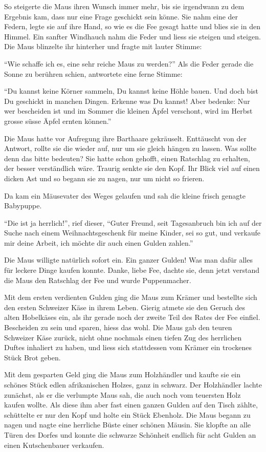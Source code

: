 So steigerte die Maus ihren Wunsch immer mehr, bis sie irgendwann zu dem Ergebnis kam, dass nur eine Frage geschickt sein könne. Sie nahm eine der Federn, legte sie auf ihre Hand, so wie es die Fee gesagt hatte und blies sie in den Himmel. Ein sanfter Windhauch nahm die Feder und liess sie steigen und steigen. Die Maus blinzelte ihr hinterher und fragte mit lauter Stimme: 

\enquote{Wie schaffe ich es, eine sehr reiche Maus zu werden?} Als die Feder gerade die Sonne zu berühren schien, antwortete eine ferne Stimme:

\enquote{Du kannst keine Körner sammeln, Du kannst keine Höhle bauen. Und doch bist Du geschickt in manchen Dingen. Erkenne was Du kannst! Aber bedenke: Nur wer bescheiden ist und im Sommer die kleinen Äpfel verschont, wird im Herbst grosse süsse Äpfel ernten können.} 

Die Maus hatte vor Aufregung ihre Barthaare gekräuselt. Enttäuscht von der Antwort, rollte sie die wieder auf, nur um sie gleich hängen zu lassen. Was sollte denn das bitte bedeuten? Sie hatte schon gehofft, einen Ratschlag zu erhalten, der besser verständlich wäre. Traurig senkte sie den Kopf. Ihr Blick viel auf einen dicken Ast und so begann sie zu nagen, nur um nicht so frieren. 

Da kam ein Mäusevater des Weges gelaufen und sah die kleine frisch genagte Babypuppe. 

\enquote{Die ist ja herrlich!}, rief dieser, \enquote{Guter Freund, seit Tagesanbruch bin ich auf der Suche nach einem Weihnachtsgeschenk für meine Kinder, sei so gut, und verkaufe mir deine Arbeit, ich möchte dir auch einen Gulden zahlen.}

Die Maus willigte natürlich sofort ein. Ein ganzer Gulden! Was man dafür alles für leckere Dinge kaufen konnte. Danke, liebe Fee, dachte sie, denn jetzt verstand die Maus den Ratschlag der Fee und wurde Puppenmacher. 

Mit dem ersten verdienten Gulden ging die Maus zum Krämer und bestellte sich den ersten Schweizer Käse in ihrem Leben. Gierig atmete sie den Geruch des alten Hobelkäses ein, als ihr gerade noch der zweite Teil des Rates der Fee einfiel. Bescheiden zu sein und sparen, hiess das wohl. Die Maus gab den teuren Schweizer Käse zurück, nicht ohne nochmals einen tiefen Zug des herrlichen Duftes inhaliert zu haben, und liess sich stattdessen vom Krämer ein trockenes Stück Brot geben. 

Mit dem gesparten Geld ging die Maus zum Holzhändler und kaufte sie ein schönes Stück edlen afrikanischen Holzes, ganz in schwarz. Der Holzhändler lachte zunächst, als er die verlumpte Maus sah, die auch noch vom teuersten Holz kaufen wollte. Als diese ihm aber fast einen ganzen Gulden auf den Tisch zählte, schüttelte er nur den Kopf und holte ein Stück Ebenholz. Die Maus begann zu nagen und nagte eine herrliche Büste einer schönen Mäusin. Sie klopfte an alle Türen des Dorfes und konnte die schwarze Schönheit endlich für acht Gulden an einen Kutschenbauer verkaufen.

